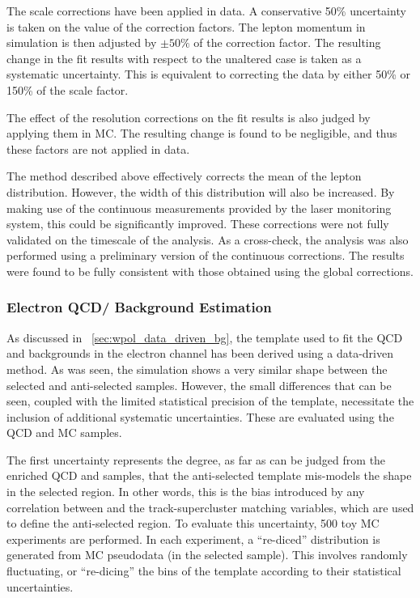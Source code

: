 The scale corrections have been applied in data. A conservative 50\% uncertainty
is taken on the value of the correction factors. The lepton momentum in
simulation is then adjusted by $\pm 50\%$ of the correction factor. The
resulting change in the fit results with respect to the unaltered case is taken
as a systematic uncertainty. This is equivalent to correcting the data by either
50\% or 150\% of the scale factor.

The effect of the resolution corrections on the fit results is also judged by
applying them in \ac{MC}. The resulting change is found to be negligible,
and thus these factors are not applied in data.

The method described above effectively corrects the mean of the lepton \Pt
distribution. However, the width of this distribution will also be increased. By
making use of the continuous measurements provided by the laser monitoring
system, this could be significantly improved. These corrections were not fully
validated on the timescale of the analysis. As a cross-check, the analysis was
also performed using a preliminary version of the continuous corrections. The
results were found to be fully consistent with those obtained using the global
corrections.

\subsubsection[Electron \ac{QCD}/\gammajets Background Estimation]{Electron \ac{QCD}/\boldmath{\gammajets} Background Estimation}
\label{sec:wpol_syst_ele_bgest}
As discussed in \sec~\ref{sec:wpol_data_driven_bg}, the template used to fit the
\ac{QCD} and \gammajets backgrounds in the electron channel has been derived
using a data-driven method. As was seen, the simulation shows a very similar \LP
shape between the selected and anti-selected samples. However, the small
differences that can be seen, coupled with the limited statistical precision of
the template, necessitate the inclusion of additional systematic
uncertainties. These are evaluated using the \ac{QCD} and \gammajets \ac{MC}
samples.

The first uncertainty represents the degree, as far as can be judged from the
enriched \ac{QCD} and \gammajets samples, that the anti-selected template
mis-models the \LP shape in the selected region. In other words, this is the
bias introduced by any correlation between \LP and the track-supercluster
matching variables, which are used to define the anti-selected region. To
evaluate this uncertainty, 500 toy \ac{MC} experiments are performed. In each
experiment, a ``re-diced'' \LP distribution is generated from \ac{MC} pseudodata
(in the selected sample). This involves randomly fluctuating, or ``re-dicing''
the bins of the \LP template according to their statistical uncertainties.

